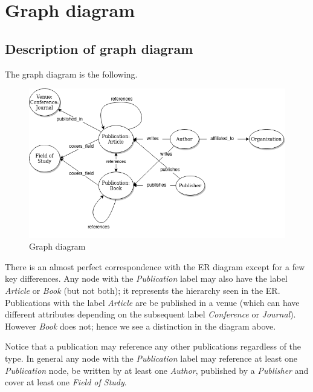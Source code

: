 \documentclass{Configuration_Files/PoliMi3i_thesis}
\begin{document}
\chapter{Graph diagram}
\section{Description of graph diagram}
The graph diagram is the following.
\begin{figure}[H]
    \centering
    \includegraphics[width=1\textwidth]{Images/graph.drawio.png}
    \caption{Graph diagram}
    \label{fig:quadtree}
\end{figure}
There is an almost perfect correspondence with the ER diagram except for a few key differences. Any node with the \textit{Publication} label may also have the label \textit{Article} or \textit{Book} (but not both); it represents the hierarchy seen in the ER. Publications with the label \textit{Article} are be published in a venue (which can have different attributes depending on the subsequent label \textit{Conference} or \textit{Journal}). However \textit{Book} does not; hence we see a distinction in the diagram above. 

Notice that a publication may reference any other publications regardless of the type. In general any node with the \textit{Publication} label may reference at least one \textit{Publication} node, be written by at least one \textit{Author}, published by a \textit{Publisher} and cover at least one \textit{Field of Study}.
\end{document}
